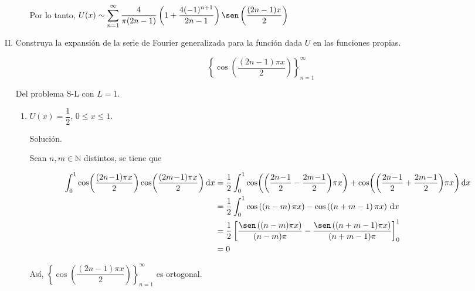 \documentclass[fleqn]{article}
\newcommand{\nat}{\mathbb{N}}
\newcommand{\integ}[3]{\displaystyle \int_{#1}^{#2} #3 \, \mathrm{d} x}
\begin{document}
\begin{enumerate}[I.]
\begin{enumerate}
            Por lo tanto, $ U(x) \sim \displaystyle \sum_{n=1}^{\infty} \dfrac{4}{\pi (2n - 1)} \left( 1 + \dfrac{4(-1)^{n+1}}{2n - 1} \right) \sen \left( \dfrac{(2n - 1) x}{2} \right) $
		\end{enumerate}


		\bfseries
			
		\item Construya la expansión de la serie de Fourier generalizada para la función dada $U$ en las funciones propias.
		
		\begin{equation*}
			\left\lbrace \cos \left( \dfrac{(2n - 1) \pi x}{2} \right) \right\rbrace_{n=1}^{\infty}
		\end{equation*}

		Del problema S-L con $ L = 1 $.
		
		\begin{enumerate}
			\item $ U(x) = \dfrac{1}{2} $, $ 0 \leq x \leq 1 $.
			
			Solución.
			
			\normalfont

			Sean $ n, m \in \nat $ distintos, se tiene que

            \begin{align*}
                \integ{0}{1}{\cos \! \left( \dfrac{(2n \! - \! 1) \pi x}{2} \right) \cos \! \left( \dfrac{(2m \! - \! 1) \pi x}{2} \right) \! } &= \dfrac{1}{2}\integ{0}{1}{ \cos \! \left( \left( \dfrac{2n \! - \! 1}{2} - \dfrac{2m \! - \! 1}{2} \right) \! \pi x \right) + \cos \! \left( \left(\dfrac{2n \! - \! 1}{2} + \dfrac{2m \! - \! 1}{2} \right) \! \pi x \right) \! } \\
                &= \dfrac{1}{2} \integ{0}{1}{ \cos \left( \left( n - m \right) \pi x \right) - \cos \left( \left( n + m - 1 \right) \pi x \right) } \\
                &= \dfrac{1}{2} \left[ \dfrac{\sen \left( (n - m) \pi x \right)}{(n - m) \pi} - \dfrac{\sen \left( (n + m - 1) \pi x \right)}{(n + m - 1) \pi} \right]_{0}^{1} \\
                &= 0
            \end{align*}

            Así, $ \left\lbrace \cos \left( \dfrac{(2n - 1) \pi x}{2} \right) \right\rbrace_{n=1}^{\infty} $ es ortogonal.


\end{enumerate}
\end{enumerate}
\end{document}
